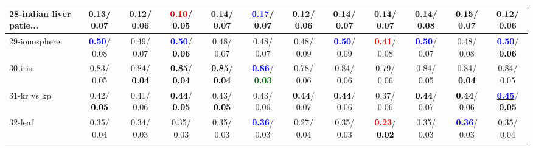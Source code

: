 \begin{table}[h]
\begin{center}
{\begin{tabular}{lc|c|c|c|c|c|c|c|c|c|c}
28-indian liver patie... &   0.13/  0.07 &   0.12/  0.06 & \textcolor{red}{\textbf{  0.10}}/\textcolor{black}{\textbf{  0.05}} &   0.14/  0.07 & \underline{\textcolor{blue}{\textbf{  0.17}}}/  0.07 &   0.12/  0.06 &   0.14/  0.07 &   0.14/  0.07 &   0.14/  0.08 & \textcolor{black}{\textbf{  0.15}}/  0.07 &   0.12/  0.06 \\ \hline
29-ionosphere & \textcolor{blue}{\textbf{  0.50}}/  0.08 &   0.49/  0.07 & \textcolor{blue}{\textbf{  0.50}}/\textcolor{black}{\textbf{  0.06}} &   0.48/  0.07 &   0.48/  0.07 &   0.48/  0.09 & \textcolor{blue}{\textbf{  0.50}}/  0.09 & \textcolor{red}{\textbf{  0.41}}/  0.08 & \textcolor{blue}{\textbf{  0.50}}/  0.07 &   0.48/  0.08 & \textcolor{blue}{\textbf{  0.50}}/\textcolor{black}{\textbf{  0.06}} \\
30-iris &   0.83/  0.05 &   0.84/\textcolor{black}{\textbf{  0.04}} & \textcolor{black}{\textbf{  0.85}}/\textcolor{black}{\textbf{  0.04}} & \textcolor{black}{\textbf{  0.85}}/\textcolor{black}{\textbf{  0.04}} & \underline{\textcolor{blue}{\textbf{  0.86}}}/\textcolor{darkgreen}{\textbf{  0.03}} &   0.78/  0.06 &   0.84/  0.06 &   0.79/  0.06 &   0.84/  0.05 &   0.84/\textcolor{black}{\textbf{  0.04}} &   0.84/  0.05 \\
31-kr vs kp &   0.42/\textcolor{black}{\textbf{  0.05}} &   0.41/  0.06 & \textcolor{black}{\textbf{  0.44}}/\textcolor{black}{\textbf{  0.05}} &   0.43/\textcolor{black}{\textbf{  0.05}} &   0.43/  0.06 & \textcolor{black}{\textbf{  0.44}}/  0.07 & \textcolor{black}{\textbf{  0.44}}/  0.06 &   0.37/  0.06 & \textcolor{black}{\textbf{  0.44}}/  0.07 & \textcolor{black}{\textbf{  0.44}}/  0.06 & \underline{\textcolor{blue}{\textbf{  0.45}}}/\textcolor{black}{\textbf{  0.05}} \\
32-leaf &   0.35/  0.04 &   0.34/  0.03 &   0.35/  0.03 &   0.35/  0.03 & \textcolor{blue}{\textbf{  0.36}}/  0.03 &   0.27/  0.04 &   0.35/  0.03 & \textcolor{red}{\textbf{  0.23}}/\textcolor{black}{\textbf{  0.02}} &   0.35/  0.03 & \textcolor{blue}{\textbf{  0.36}}/  0.03 &   0.35/  0.04 \\\end{tabular}}\label{stratsALCKappa0aELMRedux}
\end{center}
\end{table}
